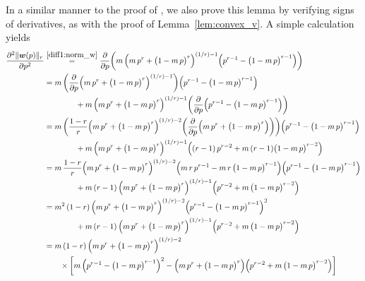 \documentclass[conference, draftcls, onecolumn]{IEEEtran}
\theoremstyle{plain}
\newcommand{\bvec}[1]{\boldsymbol{#1}}
\newcommand{\lemref}[1]{Lemma~\ref{#1}}
\begin{document}
\begin{IEEEproof}[Proof of \lemref{lem:convex_w}]
In a similar manner to the proof of \cite[Lemma~3]{part2}, we also prove this lemma by verifying signs of derivatives, as with the proof of \lemref{lem:convex_v}.
A simple calculation yields
\begin{align}
\frac{ \partial^{2} \| \bvec{w}( p ) \|_{r} }{ \partial p^{2} }
& \overset{\eqref{diff1:norm_w}}{=}
\frac{ \partial }{ \partial p } \bigg( m \, \Big( m \, p^{r} + \big( 1 - m \, p \big)^{r} \Big)^{(1/r) - 1} \Big( p^{r-1} - \big( 1 - m \, p \big)^{r-1} \Big) \bigg)
\\
& =
m \, \bigg( \frac{ \partial }{ \partial p } \Big( m \, p^{r} + \big( 1 - m \, p \big)^{r} \Big)^{(1/r) - 1} \bigg) \Big( p^{r-1} - \big( 1 - m \, p \big)^{r-1} \Big)
\notag \\
& \qquad \qquad
+ m \, \Big( m \, p^{r} + \big( 1 - m \, p \big)^{r} \Big)^{(1/r) - 1} \bigg( \frac{ \partial }{ \partial p } \Big( p^{r-1} - \big( 1 - m \, p \big)^{r-1} \Big) \bigg)
\\
& =
m \, \bigg( \frac{ 1 - r }{ r } \Big( m \, p^{r} + \big( 1 - m \, p \big)^{r} \Big)^{(1/r) - 2} \bigg( \frac{ \partial }{ \partial p } \Big( m \, p^{r} + \big( 1 - m \, p \big)^{r} \Big) \bigg) \bigg) \Big( p^{r-1} - \big( 1 - m \, p \big)^{r-1} \Big)
\notag \\
& \qquad \qquad
+ m \, \Big( m \, p^{r} + \big( 1 - m \, p \big)^{r} \Big)^{(1/r) - 1} \Big( (r-1) \, p^{r-2} + m \, (r-1) \big( 1 - m \, p \big)^{r-2} \Big)
\\
& =
m \, \frac{ 1 - r }{ r } \Big( m \, p^{r} + \big( 1 - m \, p \big)^{r} \Big)^{(1/r) - 2} \Big( m \, r \, p^{r-1} - m \, r \, \big( 1 - m \, p \big)^{r-1} \Big) \Big( p^{r-1} - \big( 1 - m \, p \big)^{r-1} \Big)
\notag \\
& \qquad \qquad
+ m \, (r-1) \, \Big( m \, p^{r} + \big( 1 - m \, p \big)^{r} \Big)^{(1/r) - 1} \Big( p^{r-2} + m \, \big( 1 - m \, p \big)^{r-2} \Big)
\\
& =
m^{2} \, (1-r) \, \Big( m \, p^{r} + \big( 1 - m \, p \big)^{r} \Big)^{(1/r) - 2} \Big( p^{r-1} - \big( 1 - m \, p \big)^{r-1} \Big)^{2}
\notag \\
& \qquad \qquad
+ m \, (r-1) \, \Big( m \, p^{r} + \big( 1 - m \, p \big)^{r} \Big)^{(1/r) - 1} \Big( p^{r-2} + m \, \big( 1 - m \, p \big)^{r-2} \Big)
\\
& =
m \, (1-r) \, \Big( m \, p^{r} + \big( 1 - m \, p \big)^{r} \Big)^{(1/r) - 2}
\notag \\
& \qquad \times
\bigg[ m \, \Big( p^{r-1} - \big( 1 - m \, p \big)^{r-1} \Big)^{2} - \Big( m \, p^{r} + \big( 1 - m \, p \big)^{r} \Big) \Big( p^{r-2} + m \, \big( 1 - m \, p \big)^{r-2} \Big) \bigg]

\end{align}
\end{IEEEproof}
\end{document}
